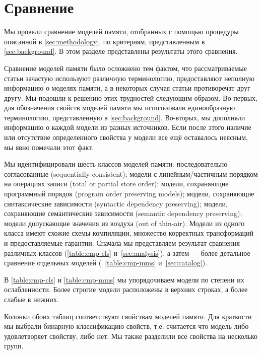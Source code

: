 \section{Сравнение}
\label{sec:comparison}

Мы провели сравнение моделей памяти, 
отобранных с помощью процедуры описанной в \cref{sec:methodology},
по критериям, представленным в \cref{sec:background}. В этом разделе представлены результаты этого сравнения.

Сравнение моделей памяти было 
осложнено тем фактом, что рассматриваемые 
статьи зачастую используют различную терминологию, 
предоставляют неполную информацию о моделях памяти, а в некоторых случая статьи  
 противоречат друг другу. 
Мы подошли к решению этих трудностей следующим образом. 
Во-первых, для обозначения свойств моделей памяти
мы использовали единообразную терминологию,
представленную в \cref{sec:background}.
Во-вторых, мы дополняли информацию о каждой модели 
из разных источников. Если после этого 
наличие или отсутствие определенного свойства у модели 
все ещё оставалось неясным, мы явно помечали этот факт. 

Мы идентифицировали шесть классов моделей памяти:
последовательно согласованные (sequentially consistent); 
модели с линейным/частичным порядком на операциях записи
(total or partial store order);
модели, сохраняющие программный порядок
(program order preserving models); 
модели, сохраняющие синтаксические зависимости 
(syntactic dependency preserving);
модели, сохраняющие семантические зависимости
(semantic dependency preserving);
модели допускающие значения из воздуха
(out of thin-air). 
Модели из одного класса имеют схожие схемы компиляции, 
множество корректных трансформаций и предоставляемые гарантии. 
Сначала мы представляем результат сравнения различных классов 
(\cref{table:cmp-cls} и~\cref{sec:analysis}),
а затем --- более детальное сравнение отдельных моделей 
(~\cref{table:cmp-mms} и~\cref{sec:catalog}).



В \cref{table:cmp-cls} и \cref{table:cmp-mms} 
мы упорядочиваем модели по степени их ослабленности. 
Более строгие модели расположены в верхних строках, 
а более слабые в нижних.  

Колонки обоих таблиц соответствуют свойствам моделей памяти.
Для краткости мы выбрали бинарную классификацию свойств,
т.е. считается что модель либо удовлетворяет свойству, либо нет. 
Мы также разделили все свойства на несколько групп. 

